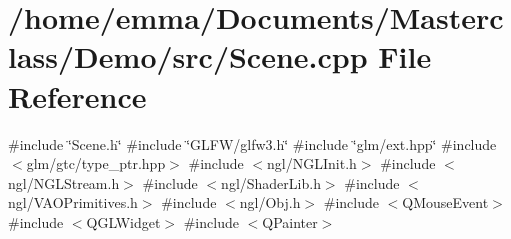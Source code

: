 \section{/home/emma/\+Documents/\+Masterclass/\+Demo/src/\+Scene.cpp File Reference}
\label{_scene_8cpp}
{\ttfamily \#include \char`\"{}Scene.\+h\char`\"{}}\newline
{\ttfamily \#include \char`\"{}G\+L\+F\+W/glfw3.\+h\char`\"{}}\newline
{\ttfamily \#include \char`\"{}glm/ext.\+hpp\char`\"{}}\newline
{\ttfamily \#include $<$glm/gtc/type\+\_\+ptr.\+hpp$>$}\newline
{\ttfamily \#include $<$ngl/\+N\+G\+L\+Init.\+h$>$}\newline
{\ttfamily \#include $<$ngl/\+N\+G\+L\+Stream.\+h$>$}\newline
{\ttfamily \#include $<$ngl/\+Shader\+Lib.\+h$>$}\newline
{\ttfamily \#include $<$ngl/\+V\+A\+O\+Primitives.\+h$>$}\newline
{\ttfamily \#include $<$ngl/\+Obj.\+h$>$}\newline
{\ttfamily \#include $<$Q\+Mouse\+Event$>$}\newline
{\ttfamily \#include $<$Q\+G\+L\+Widget$>$}\newline
{\ttfamily \#include $<$Q\+Painter$>$}\newline
